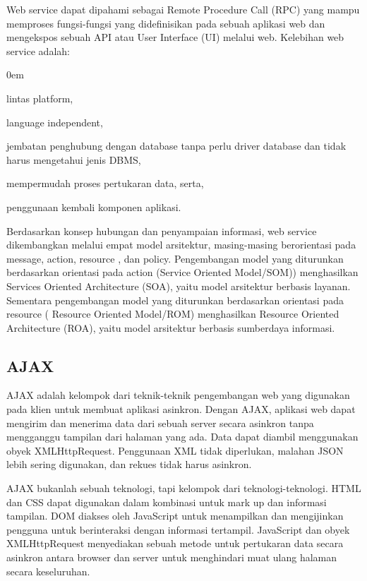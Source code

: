 \documentclass{jtetiproposalskripsi}
\begin{document}
Web service dapat dipahami sebagai Remote Procedure Call  (RPC) yang mampu memproses fungsi-fungsi yang didefinisikan pada sebuah aplikasi  web dan mengekspos sebuah API atau  User Interface (UI) melalui web. 
Kelebihan web service  adalah:
\vspace{-0.5cm}

\begin{enumerate}[a.]
\begin{singlespace}
\itemsep0em
\item lintas  platform,
\item language independent,
\item jembatan penghubung dengan database  tanpa perlu  driver database dan tidak harus mengetahui jenis DBMS,
\item mempermudah proses pertukaran data, serta,
\item penggunaan kembali komponen aplikasi.
\end{singlespace}
\end{enumerate}

Berdasarkan konsep hubungan dan penyampaian informasi, web service  dikembangkan melalui empat model arsitektur, masing-masing berorientasi pada  message,  action,  resource , dan policy. Pengembangan model yang diturunkan berdasarkan orientasi pada action (Service Oriented Model/SOM)) menghasilkan  Services Oriented Architecture  (SOA), yaitu model arsitektur berbasis layanan. Sementara pengembangan model yang diturunkan berdasarkan orientasi pada  resource  ( Resource Oriented Model/ROM) menghasilkan Resource Oriented Architecture (ROA), yaitu model arsitektur berbasis sumberdaya informasi.


\subsection{AJAX}
AJAX adalah kelompok dari teknik-teknik pengembangan web yang digunakan pada klien untuk membuat aplikasi asinkron. Dengan AJAX, aplikasi web dapat mengirim dan menerima data dari sebuah server secara asinkron tanpa mengganggu tampilan dari halaman yang ada. Data dapat diambil menggunakan obyek XMLHttpRequest. Penggunaan XML tidak diperlukan, malahan JSON lebih sering digunakan, dan rekues tidak harus asinkron.

AJAX bukanlah sebuah teknologi, tapi kelompok dari teknologi-teknologi. HTML dan CSS dapat digunakan dalam kombinasi untuk mark up dan informasi tampilan. DOM diakses oleh JavaScript untuk menampilkan dan mengijinkan pengguna untuk berinteraksi dengan informasi tertampil. JavaScript dan obyek XMLHttpRequest menyediakan sebuah metode untuk pertukaran data secara asinkron antara browser dan server untuk menghindari muat ulang halaman secara keseluruhan.
\end{document}
